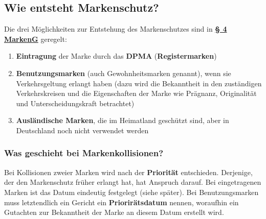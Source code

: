 \documentclass[12pt,A4]{extarticle}
\newcommand{\highlight}[1]{\textcolor{highlightColor}{\textbf{#1}}}
\newcommand{\markenG}[2][]{\textbf{\textcolor{markenGesetzLink}{\href{https://www.gesetze-im-internet.de/markeng/__#2.html}{§ #2 \ifthenelse{\equal{#1}{}}{}{#1 }MarkenG}}}}
\begin{document}
\subsection{Wie entsteht Markenschutz?}
Die drei Möglichkeiten zur Entstehung des Markenschutzes sind in \markenG{4} geregelt:
\begin{enumerate}
  \item{\highlight{Eintragung} der Marke durch das \textbf{DPMA} (\textbf{Registermarken})}
  \item{\highlight{Benutzungsmarken} (auch Gewohnheitsmarken genannt), wenn sie Verkehrsgeltung erlangt haben (dazu wird die Bekanntheit in den zuständigen Verkehrskreisen und die Eigenschaften der Marke wie Prägnanz, Originalität und Unterscheidungskraft betrachtet)}
  \item{\textbf{Ausländische Marken}, die im Heimatland geschützt sind, aber in Deutschland noch nicht verwendet werden}
\end{enumerate}

\subsubsection{Was geschieht bei Markenkollisionen?}
Bei Kollisionen zweier Marken wird nach der \highlight{Priorität} entschieden. Derjenige, der den Markenschutz früher erlangt hat, hat Anspruch darauf.
Bei eingetragenen Marken ist das Datum eindeutig festgelegt (siehe später).
Bei Benutzungsmarken muss letztendlich ein Gericht ein \textbf{Priorirätsdatum} nennen, woraufhin ein Gutachten zur Bekanntheit der Marke an diesem Datum erstellt wird.
\end{document}
